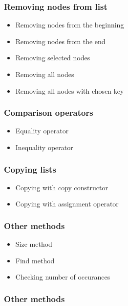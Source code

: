 \documentclass{article}
\begin{document}
\subsubsection*{Removing nodes from list}

\begin{itemize}
    \item Removing nodes from the beginning
    \item Removing nodes from the end
    \item Removing selected nodes
    \item Removing all nodes
    \item Removing all nodes with chosen key
\end{itemize}

\subsubsection*{Comparison operators}

\begin{itemize}
    \item Equality operator
    \item Inequality operator
\end{itemize}

\subsubsection*{Copying lists}

\begin{itemize}
    \item Copying with copy constructor
    \item Copying with assignment operator
\end{itemize}

\subsubsection*{Other methods}

\begin{itemize}
    \item Size method
    \item Find method
    \item Checking number of occurances
\end{itemize}

\subsubsection*{Other methods}
\end{document}
